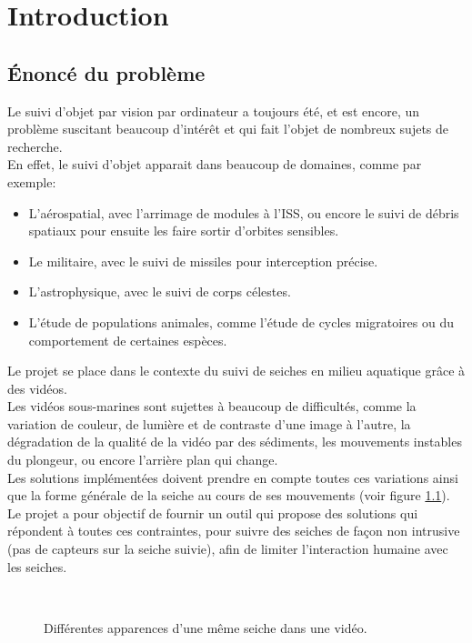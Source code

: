 \pagestyle{plain}
\chapter{Introduction}





\section{Énoncé du problème}
Le suivi d'objet par vision par ordinateur a toujours été, et est encore, un problème suscitant beaucoup d'intérêt et qui fait l'objet de nombreux sujets de recherche.\\
En effet, le suivi d'objet apparait dans beaucoup de domaines, comme par exemple:
\begin{itemize}
	\item L'aérospatial, avec l'arrimage de modules à l'ISS, ou encore le suivi de débris spatiaux pour ensuite les faire sortir d'orbites sensibles.
	\item Le militaire, avec le suivi de missiles pour interception précise.
	\item L'astrophysique, avec le suivi de corps célestes.
	\item L'étude de populations animales, comme l'étude de cycles migratoires ou du comportement de certaines espèces.\\
\end{itemize}

Le projet se place dans le contexte du suivi de seiches en milieu aquatique grâce à des vidéos.\\
Les vidéos sous-marines sont sujettes à beaucoup de difficultés, comme la variation de couleur, de lumière et de contraste d'une image à l'autre, la dégradation de la qualité de la vidéo par des sédiments, les mouvements instables du plongeur, ou encore l'arrière plan qui change.\\
Les solutions implémentées doivent prendre en compte toutes ces variations ainsi que la forme générale de la seiche au cours de ses mouvements (voir figure \ref{fig:cuttlefish_variation}).\\
Le projet a pour objectif de fournir un outil qui propose des solutions qui répondent à toutes ces contraintes, pour suivre des seiches de façon non intrusive (pas de capteurs sur la seiche suivie), afin de limiter l'interaction humaine avec les seiches.

\begin{figure}[!htbp]
\center
	\hspace{0.5cm}
	\\
	\hspace{0.5cm}
\caption{Différentes apparences d'une même seiche dans une vidéo.}
\label{fig:cuttlefish_variation}
\end{figure}
\FloatBarrier
\clearpage





